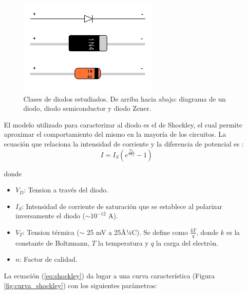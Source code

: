 \documentclass[twoside,twocolumn,a4paper]{article}
\begin{document}
\begin{figure}[h]
\captionsetup{justification=centering}
\includegraphics[width=\linewidth]{tipos_diodos.jpg}
\caption{Clases de diodos estudiados. De arriba hacia abajo: diagrama de un diodo, diodo semiconductor y diodo Zener.}
\label{fig:tipos_diodos}
\end{figure}

El modelo utilizado para caracterizar al diodo es el de Shockley, el cual permite aproximar el comportamiento del mismo en la mayor\'ia de los circuitos. La ecuaci\'on que relaciona la intensidad de corriente y la diferencia de potencial es \cite{eq:shockley}:
\begin{equation}
\label{eq:shockley}
I = I_{S}(e^\frac{V_{D}}{nV_{T}} - 1)
\end{equation}

donde

\begin{itemize}
\item 
$V_{D}$: Tension a trav\'es del diodo. 
\item 
$I_{S}$: Intensidad de corriente de saturaci\'on que se establece al polarizar inversamente el diodo ($\sim 10^{-12}$ A).
\item
$V_{T}$: Tension t\'ermica ($\sim$ 25 mV a 25Â¼C). Se define como $\frac{kT}{q}$, donde $k$ es la constante de Boltzmann, $T$ la temperatura y $q$ la carga del electr\'on.
\item
$n$: Factor de calidad.
\end{itemize}

La ecuaci\'on (\ref{eq:shockley}) da lugar a una curva caracter\'istica (Figura \ref{fig:curva_shockley}) con los siguientes par\'ametros:
\end{document}
